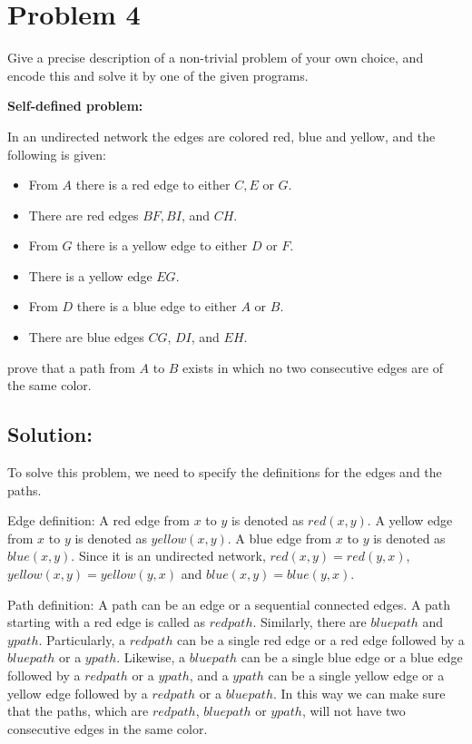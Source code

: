\section*{Problem 4}

Give a precise description of a non-trivial problem of your own choice, and encode this and solve it by one of the given programs.

\textbf{Self-defined problem:}

In an undirected network the edges are colored red, blue and yellow, and the following is given:

\begin{itemize}
  \item From $A$ there is a red edge to either $C, E$ or $G$.
  \item There are red edges $BF, BI$, and $CH$.
  \item From $G$ there is a yellow edge to either $D$ or $F$.
  \item There is a yellow edge $EG$.
  \item From $D$ there is a blue edge to either $A$ or $B$.
  \item There are blue edges $CG$, $DI$, and $EH$.
\end{itemize}
prove that a path from $A$ to $B$ exists in which no two consecutive edges
are of the same color.

\vspace{4mm}

\subsection*{Solution:}

To solve this problem, we need to specify the definitions for the edges and the paths.

Edge definition: A red edge from $x$ to $y$ is denoted as $red(x,y)$. A yellow edge from $x$ to $y$ is denoted as $yellow(x,y)$. A blue edge from $x$ to $y$ is denoted as $blue(x,y)$. Since it is an undirected network, $red(x,y) = red(y,x)$, $yellow(x,y) = yellow(y,x)$ and $blue(x,y) = blue(y,x)$.

Path definition: A path can be an edge or a sequential connected edges. A path starting with a red edge is called as $redpath$. Similarly, there are $bluepath$ and $ypath$. Particularly, a $redpath$ can be a single red edge or a red edge followed by a $bluepath$ or a $ypath$. Likewise, a $bluepath$ can be a single blue edge or a blue edge followed by a $redpath$ or a $ypath$, and a $ypath$ can be a single yellow edge or a yellow edge followed by a $redpath$ or a $bluepath$. In this way we can make sure that the paths, which are $redpath$, $bluepath$ or $ypath$, will not have two consecutive edges in the same color.

